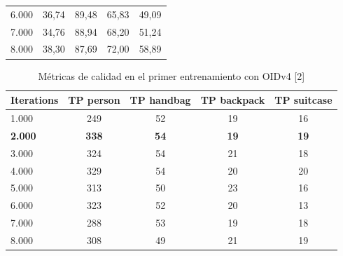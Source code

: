 \begin{table}[ht]
\begin{tabular}{lcccc}
6.000               & 36,74                                                             & 89,48                                                              & 65,83                                                               & 49,09                                                               \\
7.000               & 34,76                                                             & 88,94                                                              & 68,20                                                               & 51,24                                                               \\
8.000               & 38,30                                                             & 87,69                                                              & 72,00                                                               & 58,89                                                               \\ \hline
\end{tabular}
\end{table}

\begin{table}[ht]
\centering
\caption{Métricas de calidad en el primer entrenamiento con OIDv4 [2]}
\label{tab:metricas-test1_2}
\begin{tabular}{lcccc}
\hline
\textbf{Iterations} & \textbf{TP person} & \textbf{TP handbag} & \textbf{TP backpack} & \textbf{TP suitcase} \\ \hline
1.000               & 249                & 52                  & 19                   & 16                   \\
\textbf{2.000}      & \textbf{338}       & \textbf{54}         & \textbf{19}          & \textbf{19}          \\
3.000               & 324                & 54                  & 21                   & 18                   \\
4.000               & 329                & 54                  & 20                   & 20                   \\
5.000               & 313                & 50                  & 23                   & 16                   \\
6.000               & 323                & 52                  & 20                   & 13                   \\
7.000               & 288                & 53                  & 19                   & 18                   \\
8.000               & 308                & 49                  & 21                   & 19                   \\ \hline
\end{tabular}
\end{table}

